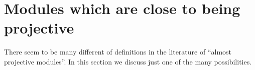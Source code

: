 \section{Modules which are close to being projective}
\label{section-near-projective}

\noindent
There seem to be many different of definitions in the literature of
``almost projective modules''. In this section we discuss just one
of the many possibilities.

